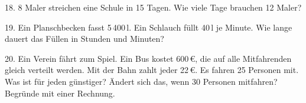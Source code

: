 \documentclass[11pt]{article}
\begin{document}
\begin{pfaufg}{}{18.}{}
8 Maler streichen eine Schule in 15 Tagen. Wie viele Tage brauchen 12 Maler?
\end{pfaufg}

\begin{pfaufg}{}{19.}{}
Ein Planschbecken fasst 5\,400\,l. Ein Schlauch füllt 40\,l je Minute. Wie lange dauert das Füllen in Stunden und Minuten?
\end{pfaufg}

\begin{pfaufg}{}{20.}{}
Ein Verein fährt zum Spiel. Ein Bus kostet 600\,€, die auf alle Mitfahrenden gleich verteilt werden. Mit der Bahn zahlt jeder 22\,€. Es fahren 25 Personen mit. Was ist für jeden günstiger? Ändert sich das, wenn 30 Personen mitfahren? Begründe mit einer Rechnung.
\end{pfaufg}

\par\vfill{}
\end{document}
